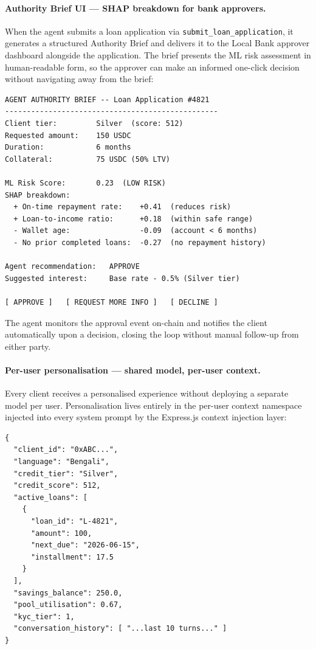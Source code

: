 \documentclass[12pt,a4paper]{report}
\begin{document}
\paragraph{Authority Brief UI --- SHAP breakdown for bank approvers.}

When the agent submits a loan application via \texttt{submit\_loan\_application}, it generates a structured Authority Brief and delivers it to the Local Bank approver dashboard alongside the application. The brief presents the ML risk assessment in human-readable form, so the approver can make an informed one-click decision without navigating away from the brief:

\begin{verbatim}
AGENT AUTHORITY BRIEF -- Loan Application #4821
-------------------------------------------------
Client tier:         Silver  (score: 512)
Requested amount:    150 USDC
Duration:            6 months
Collateral:          75 USDC (50% LTV)

ML Risk Score:       0.23  (LOW RISK)
SHAP breakdown:
  + On-time repayment rate:    +0.41  (reduces risk)
  + Loan-to-income ratio:      +0.18  (within safe range)
  - Wallet age:                -0.09  (account < 6 months)
  - No prior completed loans:  -0.27  (no repayment history)

Agent recommendation:   APPROVE
Suggested interest:     Base rate - 0.5% (Silver tier)

[ APPROVE ]   [ REQUEST MORE INFO ]   [ DECLINE ]
\end{verbatim}

\noindent The agent monitors the approval event on-chain and notifies the client automatically upon a decision, closing the loop without manual follow-up from either party.

\paragraph{Per-user personalisation --- shared model, per-user context.}

Every client receives a personalised experience without deploying a separate model per user. Personalisation lives entirely in the per-user context namespace injected into every system prompt by the Express.js context injection layer:

\begin{verbatim}
{
  "client_id": "0xABC...",
  "language": "Bengali",
  "credit_tier": "Silver",
  "credit_score": 512,
  "active_loans": [
    {
      "loan_id": "L-4821",
      "amount": 100,
      "next_due": "2026-06-15",
      "installment": 17.5
    }
  ],
  "savings_balance": 250.0,
  "pool_utilisation": 0.67,
  "kyc_tier": 1,
  "conversation_history": [ "...last 10 turns..." ]
}
\end{verbatim}
\end{document}
